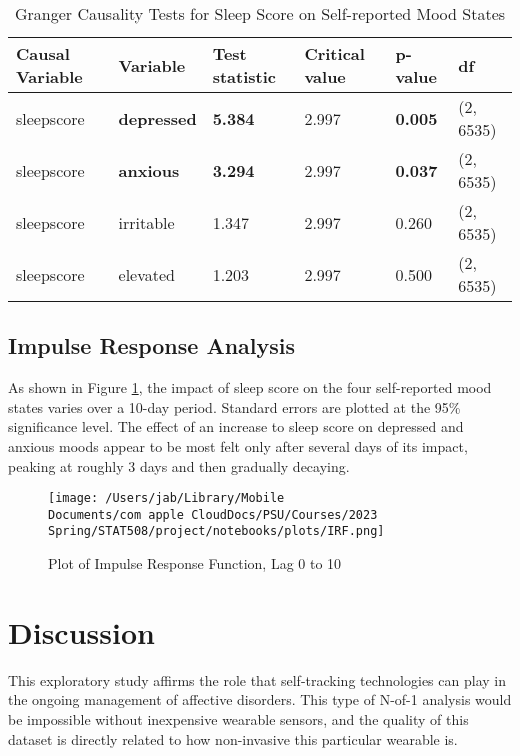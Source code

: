 \documentclass{article}
\begin{document}
\begin{table}[h]
    \centering
    \begin{tabular}{llllll}
    \toprule
        \textbf{Causal Variable} & \textbf{Variable} & \textbf{Test statistic} & \textbf{Critical value} & \textbf{p-value} & \textbf{df} \\
        \midrule
        sleepscore & \textbf{depressed} & \textbf{5.384} & 2.997 & \textbf{0.005} & (2, 6535) \\
        sleepscore & \textbf{anxious} & \textbf{3.294} & 2.997 & \textbf{0.037} & (2, 6535) \\
        sleepscore & irritable & 1.347 & 2.997 & 0.260 & (2, 6535) \\
        sleepscore & elevated & 1.203 & 2.997 & 0.500 & (2, 6535) \\
      \bottomrule
    \end{tabular}
    \caption{Granger Causality Tests for Sleep Score on Self-reported Mood
    States}
    \label{Granger}
\end{table}


\hypertarget{impulse-response-analysis-1}{%
\subsection{Impulse Response Analysis}\label{impulse-response-analysis-1}}

As shown in Figure \ref{IRF}, the impact of sleep score on the four
self-reported mood states varies over a 10-day period. Standard errors are
plotted at the 95\% significance level. The effect of an increase to sleep score
on depressed and anxious moods appear to be most felt only after several days of
its impact, peaking at roughly 3 days and then gradually decaying.

\begin{figure}[h]
\centering
  \texttt{[image: /Users/jab/Library/Mobile Documents/com~apple~CloudDocs/PSU/Courses/2023 Spring/STAT508/project/notebooks/plots/IRF.png]}
  \caption{Plot of Impulse Response Function, Lag 0 to 10}
  \label{IRF}
\end{figure}



\hypertarget{discussion}{%
\section{Discussion}\label{discussion}}

This exploratory study affirms the role that self-tracking technologies can play
in the ongoing management of affective disorders. This type of N-of-1 analysis
would be impossible without inexpensive wearable sensors, and the quality of
this dataset is directly related to how non-invasive this particular wearable is.
\end{document}
